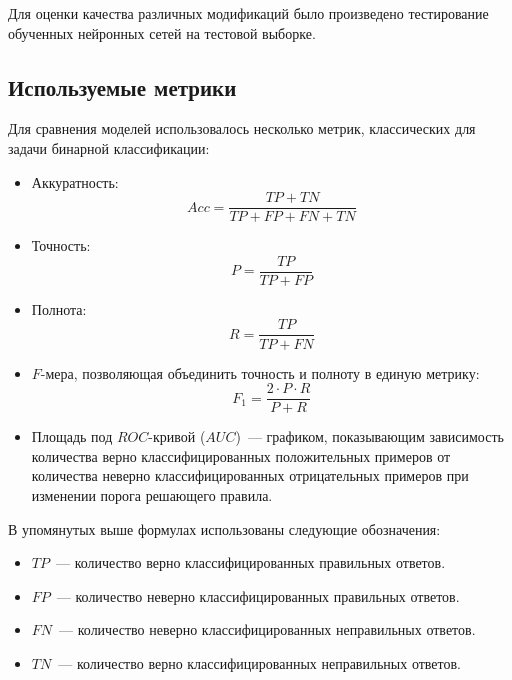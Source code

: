 \documentclass[../diploma.tex]{subfiles}
\begin{document}
	\label{sec:experiments}
	
	Для оценки качества различных модификаций было произведено тестирование обученных нейронных сетей на тестовой выборке.
	
	\subsection{Используемые метрики}

	Для сравнения моделей использовалось несколько метрик, классических для задачи бинарной классификации:

	\begin{itemize}

	    \item
		Аккуратность: 
		\begin{equation}
			Acc = \frac{TP + TN}{TP + FP + FN + TN}
   		\end{equation}

	    \item
		Точность: 
		\begin{equation}
			P = \frac{TP}{TP + FP}
   		\end{equation}

	    \item
	    Полнота: 
		\begin{equation}
			R = \frac{TP}{TP + FN}
   		\end{equation}

	    \item
		$F$-мера, позволяющая объединить точность и полноту в единую метрику:
        \begin{equation}
			F_1 = \frac{2 \cdot P \cdot R}{P + R}
   		\end{equation}

	    \item
	    Площадь под $ROC$-кривой ($AUC$)~--- графиком, показывающим зависимость количества верно классифицированных положительных примеров 
	    от количества неверно классифицированных отрицательных примеров при изменении порога решающего правила.
		
	\end{itemize}

	В упомянутых выше формулах использованы следующие обозначения:

	\begin{itemize}

		\item
		$TP$~--- количество верно классифицированных правильных ответов.

		\item
		$FP$~--- количество неверно классифицированных правильных ответов.

		\item
		$FN$~--- количество неверно классифицированных неправильных ответов.

		\item
		$TN$~--- количество верно классифицированных неправильных ответов.
	\end{itemize}
\end{document}
